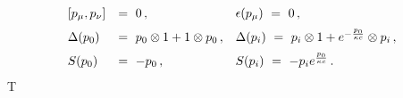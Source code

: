 \begin{equation}\begin{array}{lll}[ p_\mu , p_\nu ] & = \
0\, ,\qquad & \epsilon( p_\mu ) \ = \ 0\, ,\medskip\cr \Delta(p_0)
& = \ p_0\otimes 1 + 1\otimes p_0\, , & \Delta( p_i ) \ = \
p_i\otimes 1 + e^{-\frac{p_0}{\kappa c}}\otimes p_i\, ,\medskip\cr
S( p_0 ) & = \ -p_0\, , & S(p_i) \ = \ -p_i e^{\frac{p_0}{\kappa
c}}\, .\end{array}\label{r26}\end{equation}T
